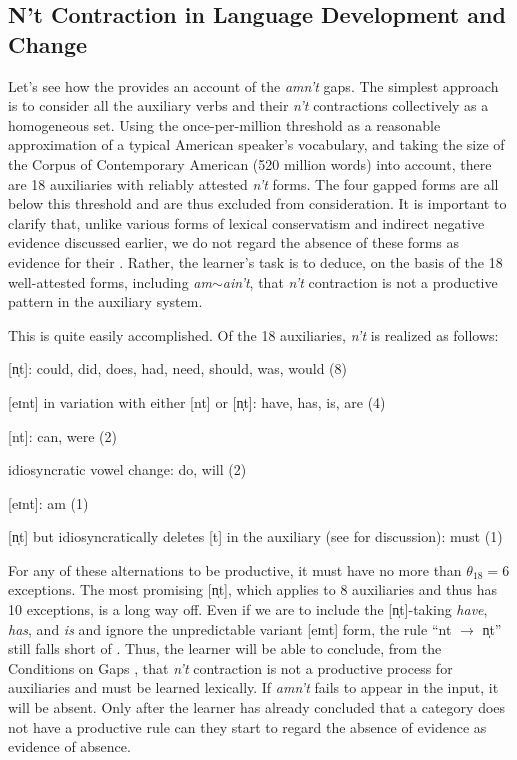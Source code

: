 \documentclass[output=paper,
modfonts
]{LSP/langsci}
\begin{document}
\subsection{ N't Contraction in Language Development and Change}
Let's see how the  provides an account of the \textit{amn't} gaps. The simplest approach is to consider all the auxiliary verbs
and their \textit{n't} contractions collectively as  a homogeneous set. Using the
once-per-million threshold as a reasonable approximation of a typical
American  speaker's vocabulary, and taking the size of the
Corpus of Contemporary American  (520 million words) into account, there are
18 auxiliaries with reliably attested \textit{n't} forms. The four
gapped forms are all below this threshold and are thus excluded from
consideration. It is important to 
clarify that, unlike various forms of lexical conservatism and
indirect negative evidence discussed earlier, we do 
not regard the absence of these forms as evidence for their
. Rather, the learner's task is  to deduce, on the
basis of the 18 well-attested forms, including \textit{am}$\sim$\textit{ain't},
that  \textit{n't} contraction is 
not a productive pattern in the  auxiliary system. 

This is quite easily accomplished. Of the 18 auxiliaries,
\textit{n't} is realized as follows:
\begin{exe}  \ex \begin{xlist}
\item {[n̩t]}: could,
  did, does, had, need, should, was, would (8)
\item   {[eɪnt]} in variation
with either [nt] or [n̩t]:  have, has, is, are (4)
\item {[nt]}: can, were (2)
\item idiosyncratic vowel change: do, will (2)
\item {[eɪnt]}: am (1)
\item {[n̩t]}  but
  idiosyncratically deletes [t] in the auxiliary (see \citealt[508--509]{Zwicky1983a}   for discussion): must (1)
\end{xlist} \end{exe}
For any of these alternations to be productive, it must have no more
than $\theta_{18} = 6$ exceptions. The most promising
[n̩t], which applies to 8 auxiliaries and thus has 10
exceptions, is a long way off. Even if we are to include the
[n̩t]-taking \textit{have}, \textit{has}, and \textit{is} and
ignore the unpredictable variant [eɪnt] form, the rule ``nt
$\longrightarrow$ n̩t'' still falls short of
. Thus, the 
learner will be able to conclude, from the Conditions on Gaps
, that \textit{n't} contraction is not a productive
process for  auxiliaries and must be learned lexically. If \textit{amn't} fails to appear in the input, it will be absent. Only after
the learner has already concluded that a category does not have a
productive rule can they start to regard the absence of evidence as
evidence of absence. 
\end{document}
